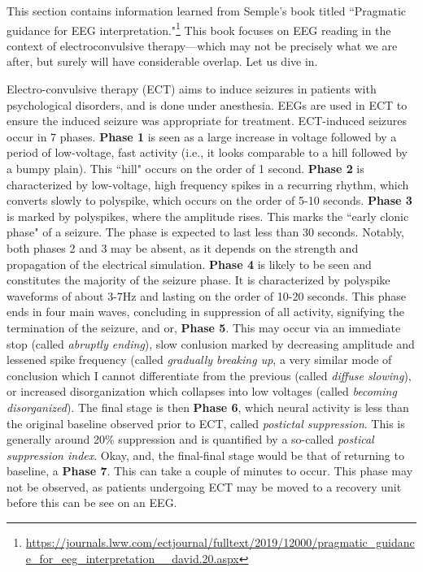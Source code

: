 This section contains information learned from Semple's book titled ``Pragmatic guidance for EEG interpretation."\footnote{\url{https://journals.lww.com/ectjournal/fulltext/2019/12000/pragmatic_guidance_for_eeg_interpretation__david.20.aspx}} This book focuses on EEG reading in the context of electroconvulsive therapy---which may not be precisely what we are after, but surely will have considerable overlap. Let us dive in.\newline

Electro-convulsive therapy (ECT) aims to induce seizures in patients with psychological disorders, and is done under anesthesia. EEGs are used in ECT to ensure the induced seizure was appropriate for treatment. ECT-induced seizures occur in 7 phases. \textbf{Phase 1} is seen as a large increase in voltage followed by a period of low-voltage, fast activity (i.e., it looks comparable to a hill followed by a bumpy plain). This ``hill" occurs on the order of 1 second. \textbf{Phase 2} is characterized by low-voltage, high frequency spikes in a recurring rhythm, which converts slowly to polyspike, which occurs on the order of 5-10 seconds. \textbf{Phase 3} is marked by polyspikes, where the amplitude rises. This marks the ``early clonic phase" of a seizure. The phase is expected to last less than 30 seconds. Notably, both phases 2 and 3 may be absent, as it depends on the strength and propagation of the electrical simulation. \textbf{Phase 4} is likely to be seen and constitutes the majority of the seizure phase. It is characterized by polyspike waveforms of about 3-7Hz and lasting on the order of 10-20 seconds. This phase ends in four main waves, concluding in suppression of all activity, signifying the termination of the seizure, and or, \textbf{Phase 5}. This may occur via an immediate stop (called \textit{abruptly ending}), slow conlusion marked by decreasing amplitude and lessened spike frequency (called \textit{gradually breaking up}, a very similar mode of conclusion which I cannot differentiate from the previous (called \textit{diffuse slowing}), or increased disorganization which collapses into low voltages (called \textit{becoming disorganized}). The final stage is then \textbf{Phase 6}, which neural activity is less than the original baseline observed prior to ECT, called \textit{postictal suppression}. This is generally around 20\% suppression and is quantified by a so-called \textit{postical suppression index}. Okay, and, the final-final stage would be that of returning to baseline, a \textbf{Phase 7}. This can take a couple of minutes to occur. This phase may not be observed, as patients undergoing ECT may be moved to a recovery unit before this can be see on an EEG. \newline

